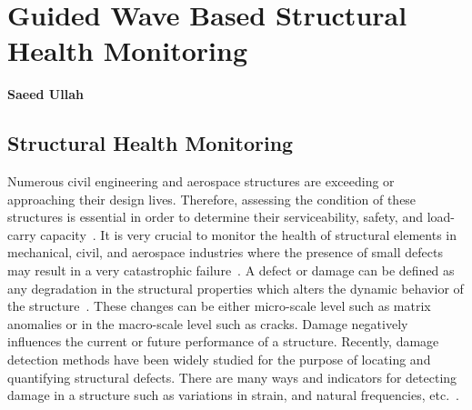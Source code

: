 \documentclass[b5paper, 11pt, titlepage]{book}
\begin{document}

\chapter{Guided Wave Based Structural Health Monitoring}
\textbf{Saeed Ullah}

\tableofcontents
\newpage
\section{Structural Health Monitoring}
Numerous civil engineering and aerospace structures are exceeding or approaching their design lives. Therefore, assessing the condition of these structures is essential in order to determine their serviceability, safety, and load-carry capacity~\cite{Farrar2007, Alampalli2007, stepinski2013advanced}. It is very crucial to monitor the health of structural elements in mechanical, civil, and aerospace industries where the presence of small defects may result in a very catastrophic failure~\cite{stepinski2013advanced}. A defect or damage can be defined as any degradation in the structural properties which alters the dynamic behavior of the structure~\cite{farrar2003damage, Farrar2012}. These changes can be either micro-scale level such as matrix anomalies or in the macro-scale level such as cracks. Damage negatively influences the current or future performance of a structure. Recently, damage detection methods have been widely studied for the purpose of locating and quantifying structural defects. There are many ways and indicators for detecting damage in a structure such as variations in strain, and natural frequencies, etc.~\cite{rytter1993a}.
\end{document}
